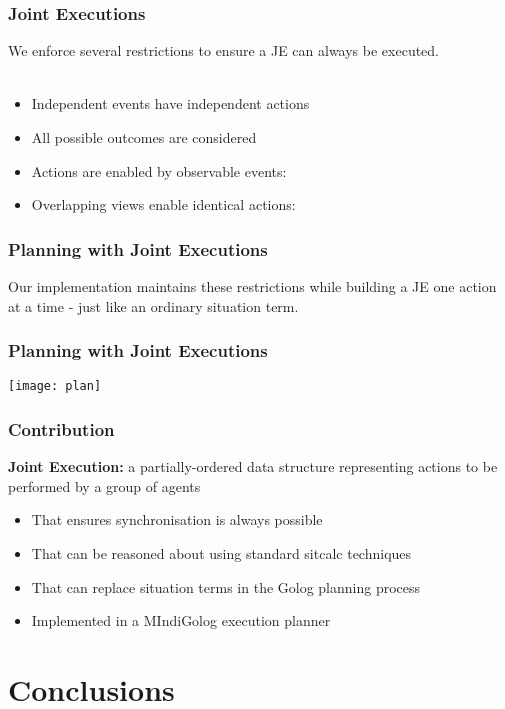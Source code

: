 \documentclass{beamer}
\begin{document}
\begin{frame}
\frametitle{Joint Executions}
We enforce several restrictions to ensure a JE can always be executed.
\ \\
\ \\
\begin{itemize}
\item Independent events have independent actions
\item All possible outcomes are considered
\item Actions are enabled by observable events:
\item Overlapping views enable identical actions:
\end{itemize}
\end{frame}

\begin{frame}
\frametitle{Planning with Joint Executions}
Our implementation maintains these restrictions while building a JE one action 
at a time - just like an ordinary situation term.


\end{frame}

\begin{frame}
\frametitle{Planning with Joint Executions}

\begin{center}
  \texttt{[image: plan]}
\end{center}

\end{frame}

\begin{frame}
\frametitle{Contribution}
\textbf{Joint Execution:}  a partially-ordered data structure representing actions to be performed by a group of agents
\begin{itemize}
\item That ensures synchronisation is always possible
\item That can be reasoned about using standard sitcalc techniques
\item That can replace situation terms in the Golog planning process
\item Implemented in a MIndiGolog execution planner
\end{itemize}
\end{frame}

\section{Conclusions}
\end{document}
